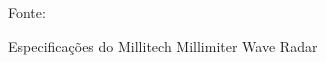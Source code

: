 \documentclass[xcolor=dvipsnames, aspectratio=169]{beamer}
\begin{document}
\begin{frame}
\begin{itemize}
        \newpage
        \begin{figure}
            \centering
            {Fonte: \cite{everett1995sensors}}
            \caption{Especificações do Millitech Millimiter Wave Radar}
            \label{fig:militech_specs}
        \end{figure}

	\end{itemize}
\end{frame}



\begin{frame}
    \printbibliography
\end{frame}


\begin{frame}
\titlepage %
\end{frame}
\end{document}
